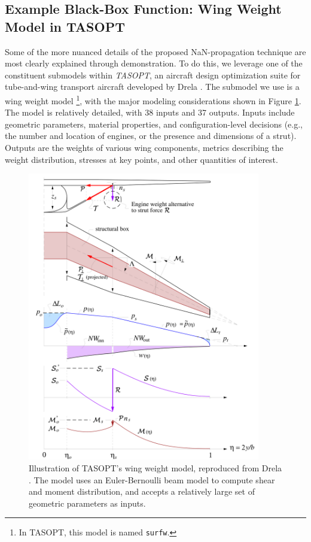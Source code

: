 \subsection{Example Black-Box Function: Wing Weight Model in TASOPT}

Some of the more nuanced details of the proposed NaN-propagation technique are most clearly explained through demonstration. To do this, we leverage one of the constituent submodels within \emph{TASOPT}, an aircraft design optimization suite for tube-and-wing transport aircraft developed by Drela \cite{drela_tasopt_2010}. The submodel we use is a wing weight model \footnote{In TASOPT, this model is named \texttt{surfw}.}, with the major modeling considerations shown in Figure \ref{fig:nan-tasopt-wing-weight}. The model is relatively detailed, with 38 inputs and 37 outputs. Inputs include geometric parameters, material properties, and configuration-level decisions (e.g., the number and location of engines, or the presence and dimensions of a strut). Outputs are the weights of various wing components, metrics describing the weight distribution, stresses at key points, and other quantities of interest.

\begin{figure}[H]
    \centering
    \includegraphics[width=4in]{../figures/nan-propagation/image1.png}
    \caption{Illustration of TASOPT's wing weight model, reproduced from Drela \cite{drela_tasopt_2010}. The model uses an Euler-Bernoulli beam model to compute shear and moment distribution, and accepts a relatively large set of geometric parameters as inputs.}
    \label{fig:nan-tasopt-wing-weight}
\end{figure}


